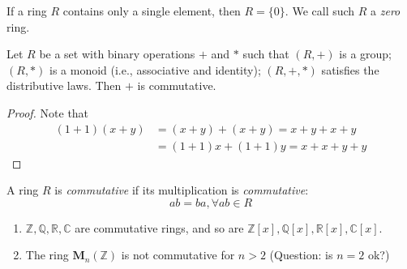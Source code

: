 \begin{proposition}
If a ring $R$ contains only a single element, then $R=\{0\}$. We call such $R$ a \emph{zero} ring.
\end{proposition}
\begin{proposition}
Let $R$ be a set with binary operations $+$ and $*$ such that $(R,+)$ is a group; $(R,*)$ is a monoid (i.e., associative and identity); $(R,+,*)$ satisfies the distributive laws. Then $+$ is commutative.
\end{proposition}
\begin{proof}
Note that
\begin{align*}
(1+1)(x+y)&=(x+y)+(x+y)=x+y+x+y\\
&=(1+1)x+(1+1)y=x+x+y+y
\end{align*}
\end{proof}

\begin{definition}[Commutative]
A ring $R$ is \emph{commutative} if its multiplication is \emph{commutative}:
\[
ab = ba,\forall ab\in R
\]
\end{definition}
\begin{example}
\begin{enumerate}
\item
$\mathbb{Z},\mathbb{Q},\mathbb{R},\mathbb{C}$ are commutative rings, and so are $\mathbb{Z}[x],\mathbb{Q}[x],\mathbb{R}[x],\mathbb{C}[x]$.
\item
The ring $\bm M_n(\mathbb{Z})$ is not commutative for $n>2$ (Question: is $n=2$ ok?)
\end{enumerate}
\end{example}
